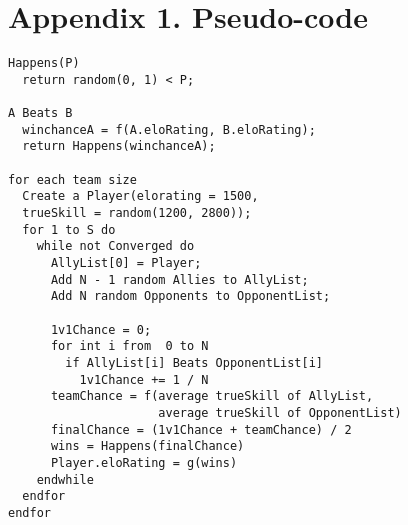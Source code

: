 \documentclass[12pt]{article}
\begin{document}
\clearpage

\section*{Appendix 1. Pseudo-code}
\begin{lstlisting}[frame=single] 
Happens(P)
  return random(0, 1) < P;

A Beats B
  winchanceA = f(A.eloRating, B.eloRating);
  return Happens(winchanceA);

for each team size
  Create a Player(elorating = 1500, 
  trueSkill = random(1200, 2800));
  for 1 to S do
    while not Converged do
      AllyList[0] = Player;
      Add N - 1 random Allies to AllyList;
      Add N random Opponents to OpponentList;

      1v1Chance = 0;
      for int i from  0 to N
        if AllyList[i] Beats OpponentList[i]
          1v1Chance += 1 / N
      teamChance = f(average trueSkill of AllyList, 
                     average trueSkill of OpponentList)
      finalChance = (1v1Chance + teamChance) / 2
      wins = Happens(finalChance)
      Player.eloRating = g(wins)
    endwhile
  endfor
endfor
\end{lstlisting}
\end{document}
